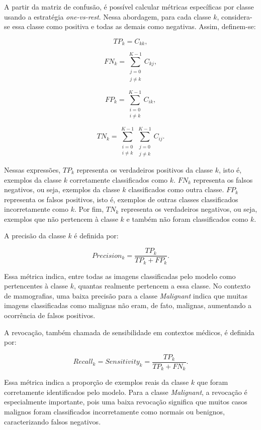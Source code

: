 \documentclass[
    12pt,
    openright,
    oneside,
    a4paper,
    english,
    brazil
]{abntex2}
\begin{document}
A partir da matriz de confusão, é possível calcular métricas específicas por classe usando a estratégia \textit{one-vs-rest}. Nessa abordagem, para cada classe \(k\), considera-se essa classe como positiva e todas as demais como negativas. Assim, definem-se:

\[
TP_k = C_{kk},
\]

\[
FN_k =
\sum_{\substack{j=0 \\ j \neq k}}^{K-1}
C_{kj},
\]

\[
FP_k =
\sum_{\substack{i=0 \\ i \neq k}}^{K-1}
C_{ik},
\]

\[
TN_k =
\sum_{\substack{i=0 \\ i \neq k}}^{K-1}
\sum_{\substack{j=0 \\ j \neq k}}^{K-1}
C_{ij}.
\]

Nessas expressões, \(TP_k\) representa os verdadeiros positivos da classe \(k\), isto é, exemplos da classe \(k\) corretamente classificados como \(k\). \(FN_k\) representa os falsos negativos, ou seja, exemplos da classe \(k\) classificados como outra classe. \(FP_k\) representa os falsos positivos, isto é, exemplos de outras classes classificados incorretamente como \(k\). Por fim, \(TN_k\) representa os verdadeiros negativos, ou seja, exemplos que não pertencem à classe \(k\) e também não foram classificados como \(k\).

A precisão da classe \(k\) é definida por:

\[
Precision_k =
\frac{TP_k}{TP_k + FP_k}.
\]

Essa métrica indica, entre todas as imagens classificadas pelo modelo como pertencentes à classe \(k\), quantas realmente pertencem a essa classe. No contexto de mamografias, uma baixa precisão para a classe \textit{Malignant} indica que muitas imagens classificadas como malignas não eram, de fato, malignas, aumentando a ocorrência de falsos positivos.

A revocação, também chamada de sensibilidade em contextos médicos, é definida por:

\[
Recall_k = Sensitivity_k =
\frac{TP_k}{TP_k + FN_k}.
\]

Essa métrica indica a proporção de exemplos reais da classe \(k\) que foram corretamente identificados pelo modelo. Para a classe \textit{Malignant}, a revocação é especialmente importante, pois uma baixa revocação significa que muitos casos malignos foram classificados incorretamente como normais ou benignos, caracterizando falsos negativos.
\end{document}
